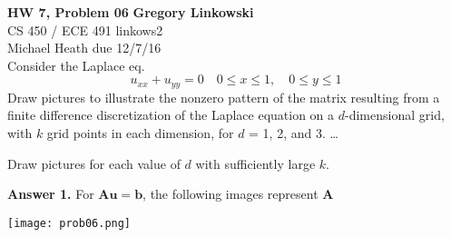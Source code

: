 \documentclass[12pt]{article}
\newenvironment{exercise}[2][Exercise]{\begin{trivlist}
\item[\hskip \labelsep {\bfseries #1}\hskip \labelsep {\bfseries #2.}]}{\end{trivlist}}
\begin{document}
\noindent
\large\textbf{HW 7, Problem 06} \hfill \textbf{Gregory Linkowski} \\
\normalsize CS 450 / ECE 491 \hfill linkows2 \\
Michael Heath \hfill due 12/7/16 \\


\vspace{5mm}
Consider the Laplace eq.
\[ u_{xx} + u_{yy} = 0 \quad 0 \leq x \leq 1, \quad 0 \leq y \leq 1 \]
Draw pictures to illustrate the nonzero pattern of the matrix resulting from a finite difference discretization of the Laplace equation on a $d$-dimensional grid, with $k$ grid points in each dimension, for $d$ = 1, 2, and 3. \dots
\vspace{-2mm} \\

\vspace{5mm}
\begin{exercise}{1}
	Draw pictures for each value of $d$ with sufficiently large $k$.
\end{exercise}%
\textbf{Answer 1.} For $\bm{A u} = \bm{b}$, the following images represent $\bm{A}$
\begin{center}
	\texttt{[image: prob06.png]}
\end{center}
\end{document}
